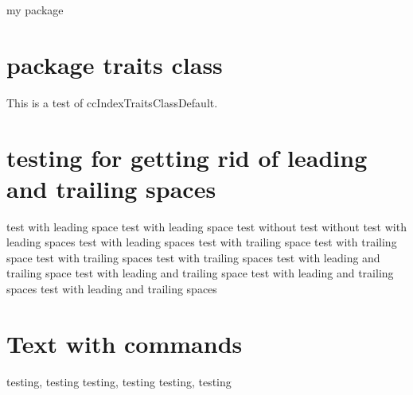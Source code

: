 \documentclass{article}
\begin{document}
{{{{\begin{ccPackage}{my package}
\end{ccPackage}

\section{package traits class}

This is a test of ccIndexTraitsClassDefault.

\pagebreak

\ccIndexTraitsClassEnd

\section{testing for getting rid of leading and trailing spaces}

test with leading space
test with leading space
test without
test without
\pagebreak[4]
test with leading spaces
test with leading spaces
\pagebreak[4]
test with trailing space
test with trailing space
\pagebreak[4]
test with trailing spaces
test with trailing spaces
\pagebreak[4]
test with leading and trailing space
test with leading and trailing space
\pagebreak[4]
test with leading and trailing spaces
test with leading and trailing spaces



\ccIndexingOff
\section{Text with commands}

testing, testing\ccIndexMainItem{\leda}%
testing, testing\ccIndexMainItem{\stl}%
testing, testing\ccIndexMainItem{\cgal}%

}}}}
\end{document}
